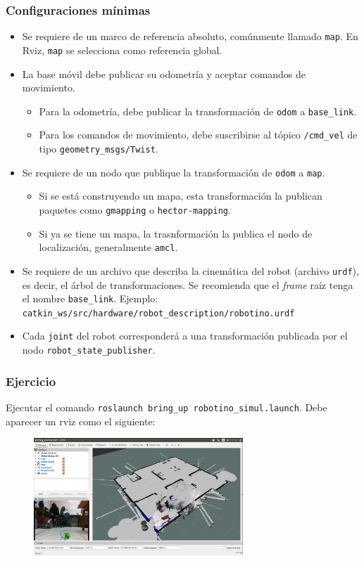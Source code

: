 \documentclass[10pt,spanish,aspectratio=1610]{beamer}
\begin{document}
\begin{frame}\frametitle{Configuraciones mínimas}
  \begin{itemize}
  \item Se requiere de un marco de referencia absoluto, comúnmente llamado \texttt{map}. En Rviz, \texttt{map} se selecciona como referencia global.
  \item La base móvil debe publicar su odometría y aceptar comandos de movimiento.
    \begin{itemize}
    \item Para la odometría, debe publicar la transformación de \texttt{odom} a \texttt{base\_link}.
    \item Para los comandos de movimiento, debe suscribirse al tópico \texttt{/cmd\_vel} de tipo \texttt{geometry\_msgs/Twist}.
    \end{itemize}
  \item Se requiere de un nodo que publique la transformación de \texttt{odom} a \texttt{map}.
    \begin{itemize}
    \item Si se está construyendo un mapa, esta transformación la publican paquetes como \texttt{gmapping} o \texttt{hector-mapping}.
    \item Si ya se tiene un mapa, la trasnformación la publica el nodo de localización, generalmente \texttt{amcl}. 
    \end{itemize}
  \item Se requiere de un archivo que describa la cinemática del robot (archivo \texttt{urdf}), es decir, el árbol de transformaciones. Se recomienda que el \textit{frame} raíz tenga el nombre \texttt{base\_link}. Ejemplo: \texttt{catkin\_ws/src/hardware/robot\_description/robotino.urdf}
    \item Cada \texttt{joint} del robot corresponderá a una transformación publicada por el nodo \texttt{robot\_state\_publisher}.
    \end{itemize}
\end{frame}

\begin{frame}\frametitle{Ejercicio}
  Ejecutar el comando \texttt{roslaunch bring\_up robotino\_simul.launch}. Debe aparecer un rviz como el siguiente:
  \begin{figure}
    \centering
    \includegraphics[width=0.7\textwidth]{Figures/RepoExample.png}
  \end{figure}
\end{frame}
\end{document}
